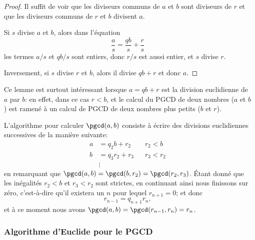 \begin{proof}
    Il suffit de voir que les diviseurs communs de \( a\) et \( b\) sont diviseurs de \( r\) et que les diviseurs communs de \( r\) et \( b\) divisent \( a\).

    Si \( s\) divise \( a\) et \( b\), alors dans l'équation
    \begin{equation*}
        \frac{ a }{ s }=\frac{ qb }{ s }+\frac{ r }{ s }
    \end{equation*}
    les termes \( a/s\) et \( qb/s\) sont entiers, donc \( r/s\) est aussi entier, et \( s\) divise \( r\).

    Inversement, si \( s\) divise \( r\) et \( b\), alors il divise \( qb+r\) et donc \( a\).
\end{proof}
\begin{remark}
    Ce lemme est surtout intéressant lorsque \( a=qb+r\) est la division euclidienne de \( a\) par \( b\): en effet, dans ce cas \( r < b \), et le calcul du PGCD de deux nombres ($a$ et $b$) est ramené à un calcul de PGCD de deux nombres plus petits ($b$ et $r$).

    L'algorithme pour calculer \( \pgcd(a,b)\) consiste à écrire des divisions euclidiennes successives de la manière suivante:
    \begin{subequations}
        \begin{align}
            a &= q_2 b   + r_2 && r_2<b\\
            b &= q_3 r_2 + r_3 && r_3<r_2\\
            &\vdots
        \end{align}
    \end{subequations}
    en remarquant que \( \pgcd(a,b)=\pgcd(b,r_2)=\pgcd(r_2,r_3) \). Étant donné que les inégalités \( r_2<b\) et \( r_3<r_2\) sont strictes, en continuant ainsi nous finissons sur zéro, c'est-à-dire qu'il existera un $n$ pour lequel \( r_{n+1} = 0 \); et donc
\begin{equation*}
    r_{n-1}=q_{n+1}r_n,
\end{equation*}
et à ce moment nous avons \( \pgcd(a,b)=\pgcd(r_{n-1},r_n)=r_n\).
\end{remark}

\subsubsection{Algorithme d'Euclide pour le PGCD}
\label{SUBSECooAEBLooFGJRkg}

